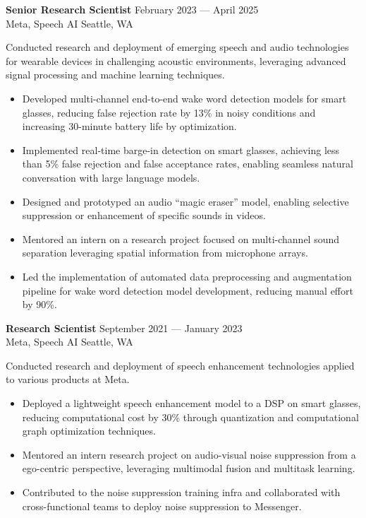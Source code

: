 \documentclass[a4paper,9pt]{extarticle} %
\begin{document}
\textbf{Senior Research Scientist} \hfill February 2023 --- April 2025 \\
Meta, Speech AI \hfill Seattle, WA \\
\vspace{-1.5\parskip}

Conducted research and deployment of emerging speech and audio technologies for wearable devices in challenging acoustic environments, leveraging advanced signal processing and machine learning techniques.
\vspace{-.9\parskip}
\begin{itemize}[nosep]
  \item Developed multi-channel end-to-end wake word detection models for smart glasses, reducing false rejection rate by 13\% in noisy conditions and increasing 30-minute battery life by optimization.
  \item Implemented real-time barge-in detection on smart glasses, achieving less than 5\% false rejection and false acceptance rates, enabling seamless natural conversation with large language models.
  \item Designed and prototyped an audio ``magic eraser'' model, enabling selective suppression or enhancement of specific sounds in videos.
  \item Mentored an intern on a research project focused on multi-channel sound separation leveraging spatial information from microphone arrays.
  \item Led the implementation of automated data preprocessing and augmentation pipeline for wake word detection model development, reducing manual effort by 90\%.
\end{itemize}

\textbf{Research Scientist} \hfill September 2021 --- January 2023 \\
Meta, Speech AI \hfill Seattle, WA \\
\vspace{-1.5\parskip}

Conducted research and deployment of speech enhancement technologies applied to various products at Meta.
\vspace{-.9\parskip}
\begin{itemize}[nosep]
  \item Deployed a lightweight speech enhancement model to a DSP on smart glasses, reducing computational cost by 30\% through quantization and computational graph optimization techniques.
  \item Mentored an intern research project on audio-visual noise suppression from a ego-centric perspective, leveraging multimodal fusion and multitask learning.
  \item Contributed to the noise suppression training infra and collaborated with cross-functional teams to deploy noise suppression to Messenger.
\end{itemize}
\end{document}
